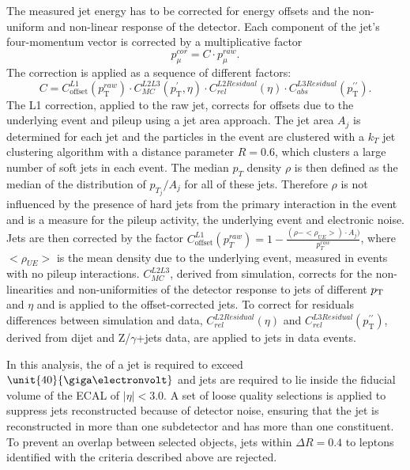 The measured jet energy has to be corrected for energy offsets and the non-uniform and non-linear response of the detector. Each component of the jet's four-momentum vector is corrected by a multiplicative factor~\cite{1748-0221-6-11-P11002}
\begin{equation}
p_{\mu}^{cor} = C \cdot p_{\mu}^{raw}.
\end{equation} 
The correction is applied as a sequence of different factors: 
\begin{equation}
C = C^{L1}_{\text{offset}}(p_{\mathrm{T}}^{raw})\cdot C^{L2L3}_{MC}(p_{\mathrm{T}}^{\prime},\eta)\cdot C^{L2Residual}_{rel}(\eta) \cdot C^{L3Residual}_{abs}(p_{\mathrm{T}}^{\prime\prime}).
\end{equation}
The L1 correction, applied to the raw jet, corrects for offsets due to the underlying event and pileup using a jet area approach. The jet area $A_j$ is determined for each jet and the particles in the event are clustered with a $k_T$ jet clustering algorithm with a distance parameter $R=0.6$, which clusters a large number of soft jets in each event. The median $p_T$ density $\rho$ is then defined as the median of the distribution of $p_{T_j}/A_j$ for all of these jets. Therefore $\rho$ is not influenced by the presence of hard jets from the primary interaction in the event and is a measure for the pileup activity, the underlying event and electronic noise. Jets are then corrected by the factor $C^{L1}_{\text{offset}}(p_T^{raw}) = 1-\frac{(\rho-<\rho_{UE}>)\cdot A_j)}{p_T^{raw}}$, where $<\rho_{UE}>$ is the mean \pt density due to the underlying event, measured in events with no pileup interactions. $C^{L2L3}_{MC}$, derived from simulation, corrects for the non-linearities and non-uniformities of the detector response to jets of different $p_{\mathrm{T}}$ and $\eta$ and is applied to the offset-corrected jets. To correct for residuals differences between simulation and data, $C^{L2Residual}_{rel}(\eta)$ and $C^{L3Residual}_{rel}(p_{\mathrm{T}}^{\prime\prime})$, derived from dijet and Z/$\gamma$+jets data, are applied to jets in data events. 

In this analysis, the \pt of a jet is required to exceed $\unit{40}{\giga\electronvolt}$ and jets are required to lie inside the fiducial volume of the ECAL of $|\eta| < 3.0$. A set of loose quality selections is applied to suppress jets reconstructed because of detector noise, ensuring that the jet is reconstructed in more than one subdetector and has more than one constituent. To prevent an overlap between selected objects, jets within $\Delta R = 0.4$ to leptons identified with the criteria described above are rejected. 

